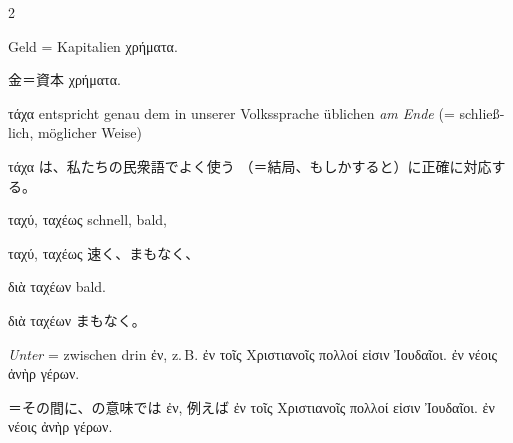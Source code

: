 \begin{paracol}{2}
\begin{enumerate}[leftmargin=0pt,rightmargin=0pt,listparindent =1cm,labelindent=1cm,labelsep=1ex,labelwidth={*},itemindent={*},align=left]
\begin{german}
\begin{continuousitemline}Geld = Kapitalien \textgreek[variant=ancient]{χρήματα.
}\par\end{continuousitemline}
\end{german}
\switchcolumn

\begin{japanese}
金＝資本 \textgreek[variant=ancient]{χρήματα.}
\end{japanese}
\switchcolumn*

\begin{german}
\item \textgreek[variant=ancient]{τάχα} ent\textcompwordmark{}spricht
genau dem in unserer Volks\textcompwordmark{}sprache üblichen \emph{am
Ende} (= schließlich, möglicher Weise)
\end{german}
\switchcolumn

\begin{japanese}
\textgreek[variant=ancient]{τάχα} は、私たちの民衆語でよく使う
（＝結局、もしかすると）に正確に対応する。
\end{japanese}
\switchcolumn*

\begin{german}
\textgreek[variant=ancient]{ταχύ, ταχέως} schnell, bald,
\end{german}
\switchcolumn

\begin{japanese}
\textgreek[variant=ancient]{ταχύ, ταχέως} 速く、まもなく、
\end{japanese}
\switchcolumn*

\begin{german}

\textgreek[variant=ancient]{διὰ ταχέων} bald. 
\end{german}
\switchcolumn

\begin{japanese}
\textgreek[variant=ancient]{διὰ ταχέων} まもなく。
\end{japanese}
\switchcolumn*

\begin{german}
\item \emph{Unter} = zwischen drin \textgreek[variant=ancient]{ἐν,} z.\,B.
\textgreek[variant=ancient]{ἐν τοῖς Χριστιανοῖς πολλοί εἰσιν Ἰουδαῖοι.
ἐν νέοις ἀνὴρ γέρων.}
\end{german}
\switchcolumn

\begin{japanese}
＝その間に、の意味では \textgreek[variant=ancient]{ἐν,} 例えば
\textgreek[variant=ancient]{ἐν τοῖς Χριστιανοῖς πολλοί εἰσιν Ἰουδαῖοι.
ἐν νέοις ἀνὴρ γέρων.}
\end{japanese}
\switchcolumn*


\end{enumerate}
\end{paracol}
